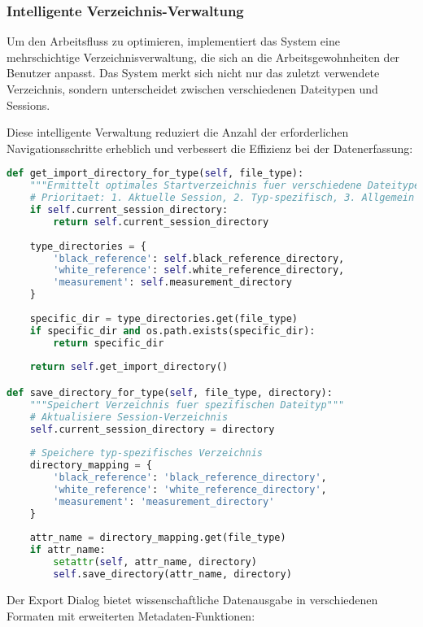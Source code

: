 \subsubsection{Intelligente Verzeichnis-Verwaltung}

Um den Arbeitsfluss zu optimieren, implementiert das System eine mehrschichtige Verzeichnisverwaltung, die sich an die Arbeitsgewohnheiten der Benutzer anpasst. Das System merkt sich nicht nur das zuletzt verwendete Verzeichnis, sondern unterscheidet zwischen verschiedenen Dateitypen und Sessions.

Diese intelligente Verwaltung reduziert die Anzahl der erforderlichen Navigationsschritte erheblich und verbessert die Effizienz bei der Datenerfassung:

\begin{lstlisting}[language=Python, caption=Mehrstufige Verzeichnis-Verwaltung]
def get_import_directory_for_type(self, file_type):
    """Ermittelt optimales Startverzeichnis fuer verschiedene Dateitypen"""
    # Prioritaet: 1. Aktuelle Session, 2. Typ-spezifisch, 3. Allgemein
    if self.current_session_directory:
        return self.current_session_directory
    
    type_directories = {
        'black_reference': self.black_reference_directory,
        'white_reference': self.white_reference_directory,
        'measurement': self.measurement_directory
    }
    
    specific_dir = type_directories.get(file_type)
    if specific_dir and os.path.exists(specific_dir):
        return specific_dir
    
    return self.get_import_directory()

def save_directory_for_type(self, file_type, directory):
    """Speichert Verzeichnis fuer spezifischen Dateityp"""
    # Aktualisiere Session-Verzeichnis
    self.current_session_directory = directory
    
    # Speichere typ-spezifisches Verzeichnis
    directory_mapping = {
        'black_reference': 'black_reference_directory',
        'white_reference': 'white_reference_directory', 
        'measurement': 'measurement_directory'
    }
    
    attr_name = directory_mapping.get(file_type)
    if attr_name:
        setattr(self, attr_name, directory)
        self.save_directory(attr_name, directory)
\end{lstlisting}

Der Export Dialog bietet wissenschaftliche Datenausgabe in verschiedenen Formaten mit erweiterten Metadaten-Funktionen:

